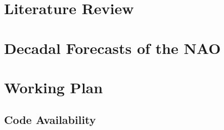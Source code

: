 \documentclass{article}
\begin{document}
\section*{Literature Review}


\section*{Decadal Forecasts of the NAO}



\section*{Working Plan}


\subsection*{Code Availability}

\printbibliography

\end{document}
